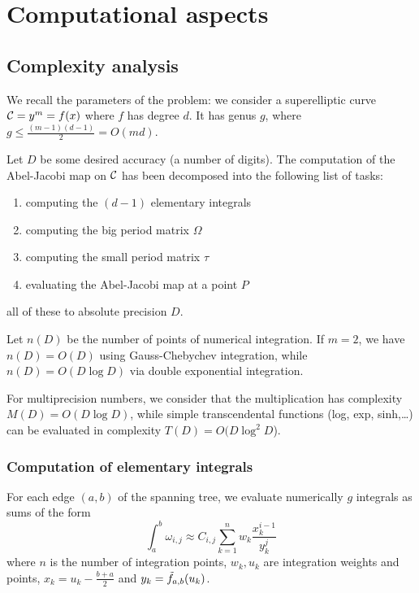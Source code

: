 \documentclass[main.tex]{subfiles}
\begin{document}
  \section{Computational aspects}

   \subsection{Complexity analysis}

   We recall the parameters of the problem: we consider a superelliptic curve
   $\mathcal{C}=y^m=f(x)$ where $f$ has degree $d$. It has genus $g$, where
   $g\leq \frac{(m-1)(d-1)}2=O(md)$.

   Let $D$ be some desired accuracy (a number of digits). The computation of
   the Abel-Jacobi map on $\mathcal{C}$ has been decomposed into the
   following list of tasks:
   \begin{enumerate}
       \item computing the $(d-1)$ elementary integrals
       \item computing the big period matrix $\Omega$
       \item computing the small period matrix $\tau$
       \item evaluating the Abel-Jacobi map at a point $P$
   \end{enumerate}
   all of these to absolute precision $D$.

   Let $n(D)$ be the number of points of numerical integration.
   If $m=2$, we have
   $n(D)=O(D)$ using Gauss-Chebychev integration, while $n(D)=O(D\log D)$
   via double exponential integration.

   For multiprecision numbers, we consider that the multiplication has
   complexity $M(D)=O(D\log D)$,
   while simple transcendental functions (log, exp, sinh,\dots) can be evaluated
   in complexity $T(D)=O(D\log^2 D$).

   \subsubsection{Computation of elementary integrals}

   For each edge $(a,b)$ of the spanning tree, we evaluate numerically $g$ integrals
   as sums of the form
   \begin{equation}
       \int_a^b\omega_{i,j} \approx C_{i,j} \sum_{k=1}^n w_k\frac{x_k^{i-1}}{y_k^j}
   \end{equation}
   where $n$ is the number of integration points, $w_k,u_k$ are integration weights and points,
   $x_k=u_k-\frac{b+a}2$ and $y_k=\tilde{f}_{a,b}(u_k)$.
\end{document}
